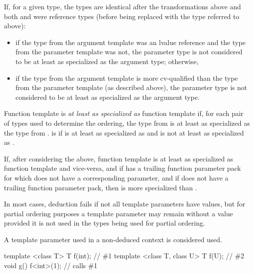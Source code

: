 \pnum
If, for a given type, the
types are identical after the transformations above
and both  and  were reference types (before being replaced with the
type referred to above):
\begin{itemize}
\item if the type from the argument template was an lvalue reference and the type
from the parameter template was not,
the parameter type is not considered to be
at least as specialized as the argument type; otherwise,
\item if the type from
the argument template is more cv-qualified than the type from the
parameter template (as described above),
the parameter type is not considered to be
at least as specialized as the argument type.
\end{itemize}

\pnum
{}%
Function template 
is \textit{at least as specialized as}
function template  if,
for each pair of types used to determine the ordering,
the type from 
is at least as specialized as
the type from .
is 
 if
is at least as specialized as
 and
is not at least as specialized as
.

\pnum
If, after considering the above, function template 
is at least as specialized as function template  and vice-versa, and
if  has a trailing function parameter pack
for which  does not have a corresponding parameter, and
if  does not have a trailing function parameter pack,
then  is more specialized than .

\pnum
In most cases,
deduction fails if not all template parameters have values,
but for partial ordering purposes a template
parameter may remain without a value provided it is not used in the
types being used for partial ordering.
\begin{note}
A template parameter used in a non-deduced context is considered used.
\end{note}
\begin{example}
\begin{codeblock}
template <class T> T f(int);            // \#1
template <class T, class U> T f(U);     // \#2
void g() {
  f<int>(1);                            // calls \#1
}
\end{codeblock}
\end{example}

